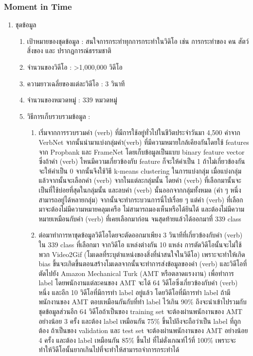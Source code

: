\subsubsection*{Moment in Time}
\begin{enumerate}
	\item {ชุดข้อมูล}
	\begin{enumerate}
		\setlength\itemsep{-0.25em}
		\item เป้าหมายของชุดข้อมูล : สนใจการกระทำทุกการกระทำในวิดิโอ เช่น การกระทำของ คน สัตว์ สิ่งของ และ ปรากฎการณ์ธรรมชาติ 
		\item จำนวนของวิดีโอ : >1,000,000 วิดีโอ
		\item ความยาวเฉลี่ยของแต่ละวิดีโอ : 3 วินาที
		\item จำนวนของหมวดหมู่ : 339 หมวดหมู่
		\item วิธีการเก็บรวบรวมข้อมูล : 
	\begin{enumerate}
		\item เริ่มจากการรวบรวมคำ (verb) ที่มีการใช้อยู่ทั่วไปในชีวิตประจำวันมา 4,500 คำจาก VerbNet จากนั้นนำมาแบ่งกลุ่มคำ(verb) ที่มีความหมายใกล้เคียงกันโดยใช้ features จาก Propbank และ FrameNet โดยเก็บข้อมูลเป็นแบบ binary feature vector ซึ่งถ้าคำ (verb) ไหนมีความเกี่ยวข้องกับ feature ก็จะให้ค่าเป็น 1 ถ้าไม่เกี่ยวข้องกันจะให้ค่าเป็น 0 จากนั้นจึงใช้วิธี k-means clustering ในการแบ่งกลุ่ม เมื่อแบ่งกลุ่มแล้วจากนั้นจะเลือกคำ (verb) จากในแต่ละกลุ่มนั้น โดยคำ (verb) ที่เลือกมานั้นจะเป็นที่ใช้บ่อยที่สุดในกลุ่มนั้น และลบคำ (verb) นั้นออกจากกลุ่มทั้งหมด (คำ ๆ หนึ่งสามารถอยู่ได้หลายกลุ่ม) จากนั้นจะทำกระบวนการนี่ไปเรื่อย ๆ แต่คำ (verb) ที่เลือกมาจะต้องไม่มีความหมายคลุมเครือ ไม่สามารถมองเห็นหรือได้ยินได้ และต้องไม่มีความหมายเหมือนกับคำ (verb) ที่เคยเลือกมาก่อน จนสุดท้ายแล้วได้ออกมาที่ 339 class
		\item ต่อมาทำการหาชุดข้อมูลวิดีโอโดยจะตัดออกมาเพียง 3 วินาทีที่เกี่ยวข้องกับคำ (verb) ใน 339 class ที่เลือกมา จากวิดีโอ แหล่งต่างกัน 10 แหล่ง การตัดวิดีโอนั้นจะไม่ใช้พวก Video2Gif (โมเดลที่ระบุตำแหน่งของสิ่งที่น่าสนใจในวิดีโอ) เพราะจะทำให้เกิด bias ขึ้นจะเกิดขึ้นตอนสร้างโมเดลจากนั้นจะทำการส่งข้อมูลของคำ (verb) และวิดีโอที่ตัดไปยัง Amazon Mechanical Turk (AMT หรือตลาดแรงงาน) เพื่อทำการ label โดยพนักงานแต่ละคนของ AMT จะได้ 64 วิดีโอซึ่งเกี่ยวข้องกับคำ (verb) หนึ่ง และอีก 10 วิดีโอที่มีการทำ label อยู่แล้ว โดยวิดีโอที่มีการทำ label ถ้ามีพนักงานของ AMT ตอบเหมือนกันกับที่ทำ label ไว้เกิน 90\% ถึงจะนำเข้าไปรวมกับชุดข้อมูลส่วนอีก 64 วิดีโอถ้าเป็นของ training set จะต้องผ่านพนักงานของ AMT อย่างน้อย 3 ครั้ง และต้อง label เหมือนกัน 75\% ขึ้นไปถึงจะถือว่าเป็น label ที่ถูกต้อง ถ้าเป็นของ validation และ test set จะต้องผ่านพนักงานของ AMT อย่างน้อย 4 ครั้ง และต้อง label เหมือนกัน 85\% ขึ้นไป ที่ไม่ตั่งเกณฑ์ไว้ที่ 100\% เพราะจะทำให้วิดีโอนั้นยากเกินไปที่จะทำให้สามารถจำการกระทำได้	

\end{enumerate}
\end{enumerate}
\end{enumerate}
